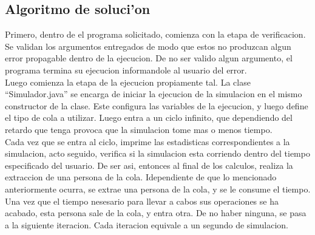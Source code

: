 \documentclass[11pt]{utalcaDoc}
\begin{document}
  \subsection{Algoritmo de soluci'on} Primero, dentro de el programa solicitado, comienza con la etapa de verificacion. Se validan los argumentos entregados de modo que estos no produzcan algun error propagable dentro de la ejecucion. De no ser valido algun argumento, el programa termina su ejecucion informandole al usuario del error.\\
  Luego comienza la etapa de la ejecucion propiamente tal. La clase ``Simulador.java'' se encarga de iniciar la ejecucion de la simulacion en el mismo constructor de la clase. Este configura las variables de la ejecucion, y luego define el tipo de cola a utilizar. Luego entra a un ciclo infinito, que dependiendo del retardo que tenga provoca que la simulacion tome mas o menos tiempo.\\
  
  Cada vez que se entra al ciclo, imprime las estadisticas correspondientes a la simulacion, acto seguido, verifica si la simulacion esta corriendo dentro del tiempo especificado del usuario. De ser asi, entonces al final de los calculos, realiza la extraccion de una persona de la cola. Idependiente de que lo mencionado anteriormente ocurra, se extrae una persona de la cola,  y se le consume el tiempo.\\
  
  Una vez que el tiempo nesesario para llevar a cabos sus operaciones se ha acabado, esta persona sale de la cola, y entra otra. De no haber ninguna, se pasa a la siguiente iteracion. Cada iteracion equivale a un segundo de simulacion.
  
\end{document}
